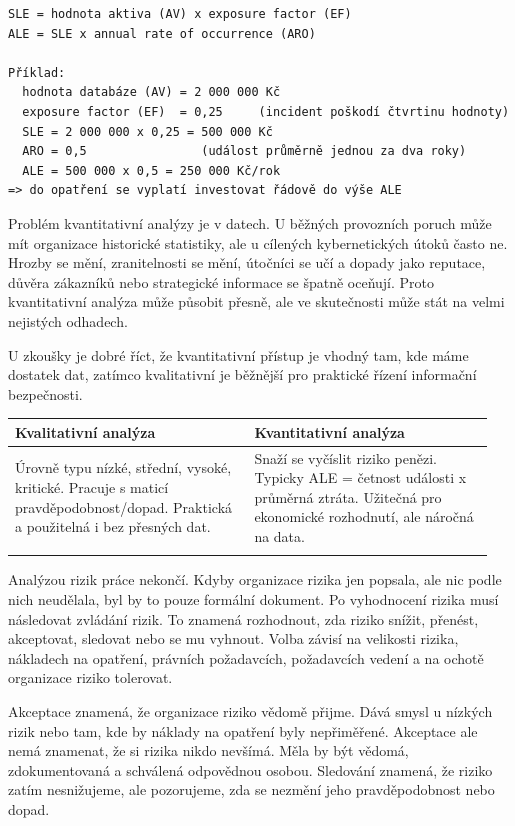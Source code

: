 \begin{codebox}
\small
\begin{verbatim}
SLE = hodnota aktiva (AV) x exposure factor (EF)
ALE = SLE x annual rate of occurrence (ARO)

Příklad:
  hodnota databáze (AV) = 2 000 000 Kč
  exposure factor (EF)  = 0,25     (incident poškodí čtvrtinu hodnoty)
  SLE = 2 000 000 x 0,25 = 500 000 Kč
  ARO = 0,5                (událost průměrně jednou za dva roky)
  ALE = 500 000 x 0,5 = 250 000 Kč/rok
=> do opatření se vyplatí investovat řádově do výše ALE
\end{verbatim}
\end{codebox}

Problém kvantitativní analýzy je v datech. U běžných provozních poruch může mít organizace historické statistiky, ale u cílených kybernetických útoků často ne. Hrozby se mění, zranitelnosti se mění, útočníci se učí a dopady jako reputace, důvěra zákazníků nebo strategické informace se špatně oceňují. Proto kvantitativní analýza může působit přesně, ale ve skutečnosti může stát na velmi nejistých odhadech.

U zkoušky je dobré říct, že kvantitativní přístup je vhodný tam, kde máme dostatek dat, zatímco kvalitativní je běžnější pro praktické řízení informační bezpečnosti.

\begin{longtable}{p{0.475\linewidth}p{0.475\linewidth}}
\toprule
\textbf{Kvalitativní analýza} & \textbf{Kvantitativní analýza} \\
\midrule\endhead
Úrovně typu nízké, střední, vysoké, kritické. Pracuje s maticí pravděpodobnost/dopad. Praktická a použitelná i bez přesných dat. & Snaží se vyčíslit riziko penězi. Typicky ALE = četnost události x průměrná ztráta. Užitečná pro ekonomické rozhodnutí, ale náročná na data. \\
\addlinespace
\bottomrule
\end{longtable}

Analýzou rizik práce nekončí. Kdyby organizace rizika jen popsala, ale nic podle nich neudělala, byl by to pouze formální dokument. Po vyhodnocení rizika musí následovat zvládání rizik. To znamená rozhodnout, zda riziko snížit, přenést, akceptovat, sledovat nebo se mu vyhnout. Volba závisí na velikosti rizika, nákladech na opatření, právních požadavcích, požadavcích vedení a na ochotě organizace riziko tolerovat.

Akceptace znamená, že organizace riziko vědomě přijme. Dává smysl u nízkých rizik nebo tam, kde by náklady na opatření byly nepřiměřené. Akceptace ale nemá znamenat, že si rizika nikdo nevšímá. Měla by být vědomá, zdokumentovaná a schválená odpovědnou osobou. Sledování znamená, že riziko zatím nesnižujeme, ale pozorujeme, zda se nezmění jeho pravděpodobnost nebo dopad.

